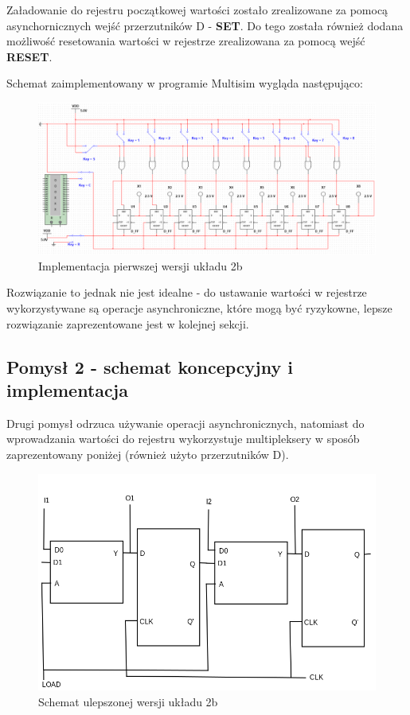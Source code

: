 \documentclass{article}
\begin{document}
Załadowanie do rejestru początkowej wartości zostało zrealizowane za pomocą asynchornicznych wejść przerzutników D - 
\textbf{SET}. Do tego została również dodana możliwość resetowania wartości w rejestrze zrealizowana za pomocą wejść 
\textbf{RESET}.

Schemat zaimplementowany w programie Multisim wygląda następująco:

\begin{figure}[H]
    \centering
    \includegraphics[width=\textwidth]{rej_1.png}
    \caption{Implementacja pierwszej wersji układu 2b}
\end{figure}

Rozwiązanie to jednak nie jest idealne - do ustawanie wartości w rejestrze wykorzystywane są operacje asynchroniczne,
które mogą być ryzykowne, lepsze rozwiązanie zaprezentowane jest w kolejnej sekcji.

\subsection{Pomysł 2 - schemat koncepcyjny i implementacja}
Drugi pomysł odrzuca używanie operacji asynchronicznych, natomiast do wprowadzania wartości do rejestru wykorzystuje
multipleksery w sposób zaprezentowany poniżej (również użyto przerzutników D).

\begin{figure}[H]
    \centering
    \includegraphics[width=\textwidth]{2_schemat_nowy.jpg}
    \caption{Schemat ulepszonej wersji układu 2b}
\end{figure}
\end{document}

